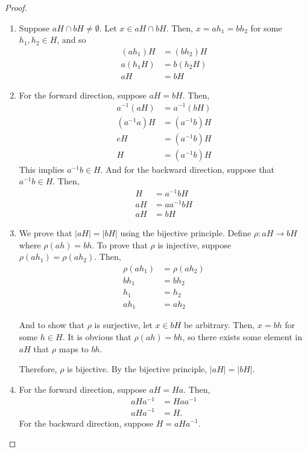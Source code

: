 \begin{proof}
\begin{enumerate}
            \item Suppose \(aH \cap bH \neq \emptyset\). Let \(x\in aH \cap bH\). Then, \(x = ah_1 = bh_2\) for some \(h_1, h_2\in H\), and so
            \begin{align*}
                (ah_1)H &= (bh_2)H \\
                a(h_1H) &= b(h_2H) \\
                aH &= bH
            \end{align*}

            \item For the forward direction, suppose \(aH = bH\). Then,
            \begin{align*}
                a^{-1}(aH) &= a^{-1}(bH) \\
                (a^{-1}a)H &= (a^{-1}b)H \\
                eH &= (a^{-1}b)H \\
                H &= (a^{-1}b)H
            \end{align*}
            This implies \(a^{-1}b\in H\). And for the backward direction, suppose that \(a^{-1}b\in H\). Then,
            \begin{align*}
                H &= a^{-1}bH \\
                aH &= aa^{-1}bH \\
                aH &= bH
            \end{align*}

            \item We prove that \(|aH| = |bH|\) using the bijective principle. Define \(\rho : aH \to bH\) where \(\rho(ah) = bh\). To prove that \(\rho\) is injective, suppose \(\rho(ah_1) = \rho(ah_2)\). Then,
            \begin{align*}
                \rho(ah_1) &= \rho(ah_2) \\
                bh_1 &= bh_2 \\
                h_1 &= h_2 \\
                ah_1 &= ah_2
            \end{align*}

            And to show that \(\rho\) is surjective, let \(x\in bH\) be arbitrary. Then, \(x = bh\) for some \(h\in H\). It is obvious that \(\rho(ah) = bh\), so there exists some element in \(aH\) that \(\rho\) maps to \(bh\). 

            Therefore, \(\rho\) is bijective. By the bijective principle, \(|aH| = |bH|\).

            \item For the forward direction, suppose \(aH = Ha\). Then,
            \begin{align*}
                aHa^{-1} &= Haa^{-1} \\
                aHa^{-1} &= H.
            \end{align*}
            For the backward direction, suppose \(H = aHa^{-1}\).
        \end{enumerate}
    \end{proof}

